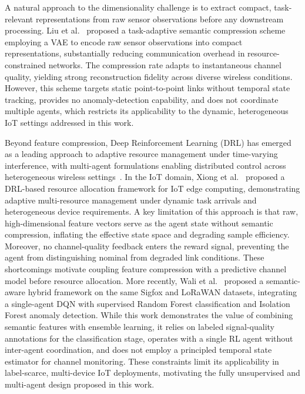\documentclass[conference]{IEEEtran}
\begin{document}
A natural approach to the dimensionality challenge is to extract compact,
task-relevant representations from raw sensor observations before any
downstream processing. Liu et al.~\cite{ref_vae_wireless} proposed a
task-adaptive semantic compression scheme employing a VAE to encode raw sensor observations into compact representations,
substantially reducing communication overhead in resource-constrained
networks. The compression rate adapts to instantaneous channel quality,
yielding strong reconstruction fidelity across diverse wireless conditions.
However, this scheme targets static point-to-point links without temporal
state tracking, provides no anomaly-detection capability, and does not
coordinate multiple agents, which restricts its applicability to the dynamic,
heterogeneous IoT settings addressed in this work.

Beyond feature compression, Deep Reinforcement Learning (DRL) has emerged as a leading approach to
adaptive resource management under time-varying interference, with
multi-agent formulations enabling distributed control across heterogeneous
wireless settings~\cite{ref_drl_comm2}. In the IoT domain,
Xiong et al.~\cite{ref_drl_iot} proposed a DRL-based resource allocation framework for IoT edge computing,
demonstrating adaptive multi-resource management under dynamic task arrivals and heterogeneous device requirements.
A key limitation of this approach is that
raw, high-dimensional feature vectors serve as the agent state without
semantic compression, inflating the effective state space and degrading
sample efficiency. Moreover, no channel-quality feedback enters the reward
signal, preventing the agent from distinguishing nominal from degraded
link conditions. These shortcomings motivate coupling feature compression
with a predictive channel model before resource allocation.
More recently, Wali et al.~\cite{ref_wali2025} proposed a semantic-aware hybrid framework on the same
Sigfox and LoRaWAN datasets, integrating a single-agent DQN with supervised Random Forest
classification and Isolation Forest anomaly detection.
While this work demonstrates the value of combining semantic features with ensemble learning,
it relies on labeled signal-quality annotations for the classification stage, operates with a
single RL agent without inter-agent coordination, and does not employ a principled temporal
state estimator for channel monitoring. These constraints limit its applicability in
label-scarce, multi-device IoT deployments, motivating the fully unsupervised and
multi-agent design proposed in this work.
\end{document}
